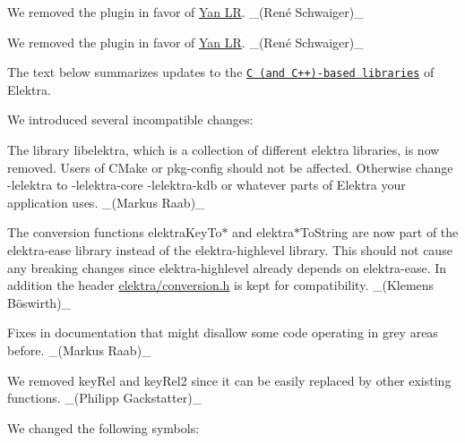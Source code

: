 \begin{DoxyItemize}
\item We removed the plugin in favor of \hyperlink{autotoc_md897_src_plugins_yanlr_README_md}{Yan LR}. \+\_\+(René Schwaiger)\+\_\+
\end{DoxyItemize}


\begin{DoxyItemize}
\item We removed the plugin in favor of \hyperlink{autotoc_md897_src_plugins_yanlr_README_md}{Yan LR}. \+\_\+(René Schwaiger)\+\_\+
\end{DoxyItemize}

The text below summarizes updates to the \href{https://www.libelektra.org/libraries/readme}{\tt C (and C++)-\/based libraries} of Elektra.

We introduced several incompatible changes\+:


\begin{DoxyItemize}
\item The library {\ttfamily libelektra}, which is a collection of different elektra libraries, is now removed. Users of C\+Make or pkg-\/config should not be affected. Otherwise change {\ttfamily -\/lelektra} to {\ttfamily -\/lelektra-\/core -\/lelektra-\/kdb} or whatever parts of Elektra your application uses. \+\_\+(\+Markus Raab)\+\_\+
\item The conversion functions {\ttfamily elektra\+Key\+To$\ast$} and {\ttfamily elektra$\ast$\+To\+String} are now part of the {\ttfamily elektra-\/ease} library instead of the {\ttfamily elektra-\/highlevel} library. This should not cause any breaking changes since {\ttfamily elektra-\/highlevel} already depends on {\ttfamily elektra-\/ease}. In addition the header {\ttfamily \hyperlink{conversion_8h}{elektra/conversion.\+h}} is kept for compatibility. \+\_\+(Klemens Böswirth)\+\_\+
\item Fixes in documentation that might disallow some code operating in grey areas before. \+\_\+(\+Markus Raab)\+\_\+
\item We removed {\ttfamily key\+Rel} and {\ttfamily key\+Rel2} since it can be easily replaced by other existing functions. \+\_\+(\+Philipp Gackstatter)\+\_\+
\end{DoxyItemize}

We changed the following symbols\+:


